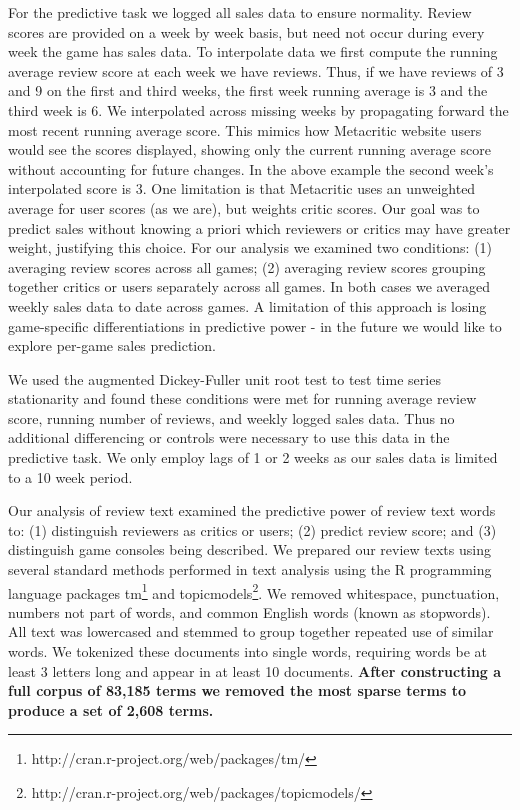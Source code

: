\documentclass[letterpaper]{article}
\begin{document}
For the predictive task we logged all sales data to ensure normality. Review scores are provided on a week by week basis, but need not occur during every week the game has sales data. To interpolate data we first compute the running average review score at each week we have reviews. Thus, if we have reviews of 3 and 9 on the first and third weeks, the first week running average is 3 and the third week is 6. We interpolated across missing weeks by propagating forward the most recent running average score. This mimics how Metacritic website users would see the scores displayed, showing only the current running average score without accounting for future changes. In the above example the second week's interpolated score is 3. One limitation is that Metacritic uses an unweighted average for user scores (as we are), but weights critic scores. Our goal was to predict sales without knowing a priori which reviewers or critics may have greater weight, justifying this choice. For our analysis we examined two conditions: (1) averaging review scores across all games; (2) averaging review scores grouping together critics or users separately across all games. In both cases we averaged weekly sales data to date across games. A limitation of this approach is losing game-specific differentiations in predictive power - in the future we would like to explore per-game sales prediction.

We used the augmented Dickey-Fuller unit root test to test time series stationarity and found these conditions were met for running average review score, running number of reviews, and weekly logged sales data. Thus no additional differencing or controls were necessary to use this data in the predictive task. We only employ lags of 1 or 2 weeks as our sales data is limited to a 10 week period.

Our analysis of review text examined the predictive power of review text words to: (1) distinguish reviewers as critics or users; (2) predict review score; and (3) distinguish game consoles being described. We prepared our review texts using several standard methods performed in text analysis using the R programming language packages tm\footnote{http://cran.r-project.org/web/packages/tm/} and topicmodels\footnote{http://cran.r-project.org/web/packages/topicmodels/}. We removed whitespace, punctuation, numbers not part of words, and common English words (known as stopwords). All text was lowercased and stemmed to group together repeated use of similar words. We tokenized these documents into single words, requiring words be at least 3 letters long and appear in at least 10 documents. \textbf{After constructing a full corpus of 83,185 terms we removed the most sparse terms to produce a set of 2,608 terms.}
\end{document}
